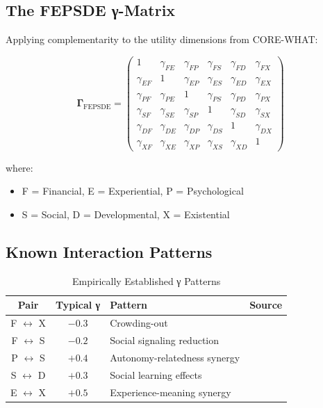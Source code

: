 \subsection{The FEPSDE γ-Matrix}

Applying complementarity to the utility dimensions from CORE-WHAT:

\begin{equation}
\mathbf{\Gamma}_{\text{FEPSDE}} = \begin{pmatrix}
1 & \gamma_{FE} & \gamma_{FP} & \gamma_{FS} & \gamma_{FD} & \gamma_{FX} \\
\gamma_{EF} & 1 & \gamma_{EP} & \gamma_{ES} & \gamma_{ED} & \gamma_{EX} \\
\gamma_{PF} & \gamma_{PE} & 1 & \gamma_{PS} & \gamma_{PD} & \gamma_{PX} \\
\gamma_{SF} & \gamma_{SE} & \gamma_{SP} & 1 & \gamma_{SD} & \gamma_{SX} \\
\gamma_{DF} & \gamma_{DE} & \gamma_{DP} & \gamma_{DS} & 1 & \gamma_{DX} \\
\gamma_{XF} & \gamma_{XE} & \gamma_{XP} & \gamma_{XS} & \gamma_{XD} & 1
\end{pmatrix}
\end{equation}

where:
\begin{itemize}[nosep]
\item F = Financial, E = Experiential, P = Psychological
\item S = Social, D = Developmental, X = Existential
\end{itemize}

\subsection{Known Interaction Patterns}

\begin{table}[htbp]
\centering
\caption{Empirically Established γ Patterns}
\label{tab:how-empirical-gamma}
\renewcommand{\arraystretch}{1.3}
\begin{tabular}{@{}cclc@{}}
\toprule
\textbf{Pair} & \textbf{Typical γ} & \textbf{Pattern} & \textbf{Source} \\
\midrule
F $\leftrightarrow$ X & $-0.3$ & Crowding-out & \citet{frey1997relationship} \\
F $\leftrightarrow$ S & $-0.2$ & Social signaling reduction & \citet{gneezy2011pay} \\
P $\leftrightarrow$ S & $+0.4$ & Autonomy-relatedness synergy & \citet{ryan2000self} \\
S $\leftrightarrow$ D & $+0.3$ & Social learning effects & \citet{bandura1977social} \\
E $\leftrightarrow$ X & $+0.5$ & Experience-meaning synergy & \citet{kahneman1999wellbeing} \\
\bottomrule
\end{tabular}
\end{table}



